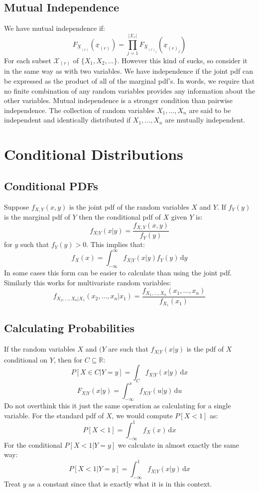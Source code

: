 \documentclass[12pt]{article}
\begin{document}
\subsection{Mutual Independence}
We have mutual independence if:
\[F_{\underline{X}_{(r)}}(\underline{x}_{(r)})=\prod^{|\mathcal{X}_r|}_{j=1}F_{\underline{X}_{(r)_j}}(\underline{x}_{(r)_j})\]
For each subset \(\mathcal{X}_{(r)}\) of \(\{X_1,X_2,\dots\}\). However this kind of sucks, so consider it in the same way as with two variables. We have independence if the joint pdf can be expressed as the product of all of the marginal pdf's. In words, we require that no finite combination of any random variables provides any information about the other variables. Mutual independence is a stronger condition than pairwise independence. The collection of random variables \(X_1,\dots,X_n\) are said to be independent and identically distributed if \(X_1,\dots,X_n\) are mutually independent.
\clearpage
\section{Conditional Distributions}
\subsection{Conditional PDFs}
Suppose \(f_{X,Y}(x,y)\) is the joint pdf of the random variables \(X\) and \(Y\). If \(f_Y(y)\) is the marginal pdf of \(Y\) then the conditional pdf of \(X\) given \(Y\) is:
\[f_{X|Y}(x|y)=\frac{f_{X,Y}(x,y)}{f_Y(y)}\]
for \(y\) such that \(f_Y(y)>0\). This implies that:
\[f_X(x)=\int^\infty_{-\infty}f_{X|Y}(x|y)f_Y(y)\,\text{d}y\]
In some cases this form can be easier to calculate than using the joint pdf. Similarly this works for multivariate random variables:
\[f_{X_2,\dots,X_n|X_1}(x_2,\dots,x_n|x_1)=\frac{f_{X_1,\dots,X_n}(x_1,\dots,x_n)}{f_{X_1}(x_1)}\]
\subsection{Calculating Probabilities}
If the random variables \(X\) and \((Y\) are such that \(f_{X|Y}(x|y)\) is the pdf of \(X\) conditional on \(Y\), then for \(C\subseteq\mathbb{R}\):
\[P[X\in C| Y=y]=\int_C f_{X|Y}(x|y)\,\text{d}x\]
\[F_{X|Y}(x|y)=\int^x_{-\infty}f_{X|Y}(u|y)\,\text{d}u\]
Do not overthink this it just the same operation as calculating for a single variable. For the standard pdf of \(X\), we would compute \(P[X<1]\) as:
\[P[X<1]=\int^1_{-\infty}f_X(x)\,\text{d}x\]
For the conditional \(P[X<1|Y=y]\) we calculate in almost exactly the same way:
\[P[X<1|Y=y]=\int^1_{-\infty}f_{X|Y}(x|y)\,\text{d}x\]
Treat \(y\) as a constant since that is exactly what it is in this context.
\end{document}
